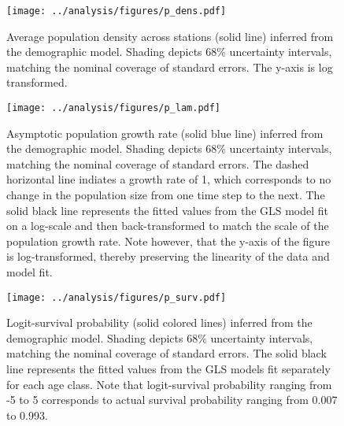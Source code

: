 \documentclass[11pt]{article}
\begin{document}
\clearpage
\begin{figure}
\centering
\texttt{[image: ../analysis/figures/p\_dens.pdf]}
\caption{\label{fig:p_dens}
Average population density across stations (solid line) 
inferred from the demographic model.
Shading depicts 68\% uncertainty intervals, 
matching the nominal coverage of standard errors.
The y-axis is log transformed.
}
\end{figure}
\clearpage

\clearpage
\begin{figure}
\centering
\texttt{[image: ../analysis/figures/p\_lam.pdf]}
\caption{\label{fig:p_lam}
Asymptotic population growth rate (solid blue line) inferred from the demographic model.
Shading depicts 68\% uncertainty intervals, 
matching the nominal coverage of standard errors.
The dashed horizontal line indiates a growth rate of 1,
which corresponds to no change in the population size from one time step to the next.
The solid black line represents the fitted values from the GLS model
fit on a log-scale and then back-transformed 
to match the scale of the population growth rate.
Note however, that the y-axis of the figure is log-transformed, 
thereby preserving the linearity of the data and model fit.
}
\end{figure}
\clearpage

\clearpage
\begin{figure}
\centering
\texttt{[image: ../analysis/figures/p\_surv.pdf]}
\caption{\label{fig:p_surv}
Logit-survival probability (solid colored lines) inferred from the demographic model.
Shading depicts 68\% uncertainty intervals, 
matching the nominal coverage of standard errors.
The solid black line represents the fitted values from the GLS models
fit separately for each age class.
Note that logit-survival probability ranging from -5 to 5 
corresponds to actual survival probability ranging from 0.007 to 0.993.
}
\end{figure}
\clearpage
\end{document}
